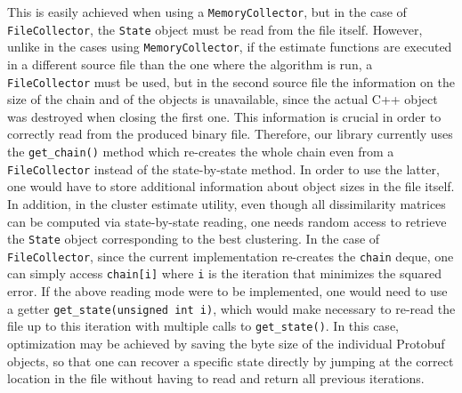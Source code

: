 This is easily achieved when using a \verb|MemoryCollector|, but in the case of \verb|FileCollector|, the \verb|State| object must be read from the file itself.
However, unlike in the cases using \verb|MemoryCollector|, if the estimate functions are executed in a different source file than the one where the algorithm is run, a \verb|FileCollector| must be used, but in the second source file the information on the size of the chain and of the objects is unavailable, since the actual C++ object was destroyed when closing the first one.
This information is crucial in order to correctly read from the produced binary file.
Therefore, our library currently uses the \verb|get_chain()| method which re-creates the whole chain even from a \verb|FileCollector| instead of the state-by-state method.
In order to use the latter, one would have to store additional information about object sizes in the file itself. \\
In addition, in the cluster estimate utility, even though all dissimilarity matrices can be computed via state-by-state reading, one needs random access to retrieve the \verb|State| object corresponding to the best clustering.
In the case of \verb|FileCollector|, since the current implementation re-creates the \verb|chain| deque, one can simply access \verb|chain[i]| where \verb|i| is the iteration that minimizes the squared error.
If the above reading mode were to be implemented, one would need to use a getter \verb|get_state(unsigned int i)|, which would make necessary to re-read the file up to this iteration with multiple calls to \verb|get_state()|.
In this case, optimization may be achieved by saving the byte size of the individual Protobuf objects, so that one can recover a specific state directly by jumping at the correct location in the file without having to read and return all previous iterations.


